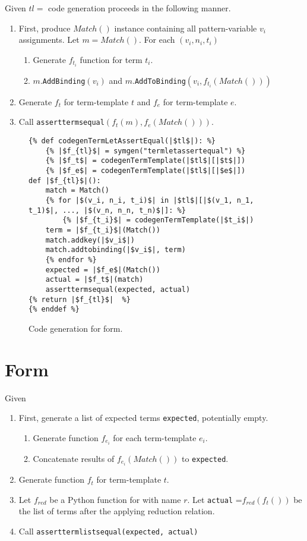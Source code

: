 Given $tl=$ \TermLetAssertEqual code generation proceeds in the following manner.
\begin{enumerate}
\item First, produce $Match()$ instance containing all pattern-variable $v_i$ assignments. Let $m=Match()$. For each $(v_i, n_i, t_i)$
	\begin{enumerate}
	\item Generate $f_{t_i}$ function for term $t_i$.
	\item $m$.\texttt{AddBinding}$(v_i)$ and $m$.\texttt{AddToBinding}$(v_i, f_{t_i}(Match()))$
	\end{enumerate}
\item Generate $f_t$ for term-template $t$ and $f_e$ for term-template $e$.
\item Call \texttt{asserttermsequal}$(f_t(m), f_e(Match()))$.
\end{enumerate}

\begin{figure}[h]
\begin{verbatim}
{% def codegenTermLetAssertEqual(|$tl$|): %}
	{% |$f_{tl}$| = symgen("termletassertequal") %}
	{% |$f_t$| = codegenTermTemplate(|$tl$|[|$t$|])
	{% |$f_e$| = codegenTermTemplate(|$tl$|[|$e$|])
def |$f_{tl}$|():
	match = Match()
	{% for |$(v_i, n_i, t_i)$| in |$tl$|[|$(v_1, n_1, t_1)$|, ..., |$(v_n, n_n, t_n)$|]: %}
		{% |$f_{t_i}$| = codegenTermTemplate(|$t_i$|)
	term = |$f_{t_i}$|(Match())
	match.addkey(|$v_i$|)
	match.addtobinding(|$v_i$|, term)
	{% endfor %}
	expected = |$f_e$|(Match())
	actual = |$f_t$|(match)
	asserttermsequal(expected, actual)
{% return |$f_{tl}$|  %}
{% enddef %}
\end{verbatim}
\caption{Code generation for \TermLetAssertEqualNoArgs \space form.}
\label{codegen-termlet}
\end{figure}


\section{\ApplyReductionRelationAssertEqualNoArgs \space Form}

Given \ApplyReductionRelationAssertEqual
\begin{enumerate}
\item First, generate a list of expected terms \texttt{expected}, potentially empty.
	\begin{enumerate}
	\item Generate function $f_{e_i}$ for each term-template $e_i$.
	\item Concatenate results of $f_{e_i}(Match())$ to \texttt{expected}.
	\end{enumerate}
\item Generate function $f_t$ for term-template $t$.
\item Let $f_{red}$ be a Python function for \RedexMatchAssertEqualNoArgs \space with name $r$. Let \texttt{actual} =$f_{red}(f_t())$ be the list of terms after the applying reduction relation.
\item Call \texttt{asserttermlistsequal(expected, actual)}
\end{enumerate}



